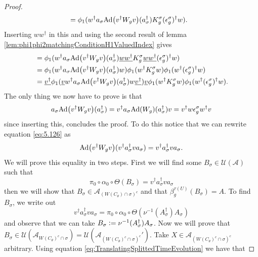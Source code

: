 \documentclass[12pt,a4paper,twoside]{article}
\newcommand{\defeq}{\vcentcolon=}
\let\originalleft\left
\let\originalright\right
\renewcommand{\left}{\mathopen{}\mathclose\bgroup\originalleft}
\renewcommand{\right}{\aftergroup\egroup\originalright}
\newcommand{\UU}{\mathcal U}
\renewcommand{\AA}{\mathcal A}
\newcommand{\Ad}[1]{\textrm{Ad}\left(#1\right)}
\theoremstyle{definition}
\numberwithin{equation}{section}
\begin{document}
\begin{proof}
\begin{align}
		&=\phi_1(w^\dagger a_\sigma \Ad{v^\dagger W_g v}(a_\sigma^\dagger)K_g^\sigma  (\epsilon_g^\sigma)^\dagger w).
	\end{align}
	Inserting $w w^\dagger$ in this and using the second result of lemma \ref{lem:phi1phi2matchingConditionH1ValuedIndex} gives
	\begin{align}
		&=\phi_1(w^\dagger a_\sigma \Ad{v^\dagger W_g v}(a_\sigma^\dagger)\underline{w w^\dagger}K_g^\sigma \underline{w w^\dagger}  (\epsilon_g^\sigma)^\dagger w)\\
		&=\phi_1(w^\dagger a_\sigma \Ad{v^\dagger W_g v}(a_\sigma^\dagger)w)\phi_1( w^\dagger K_g^\sigma w ) \phi_1( w^\dagger  (\epsilon_g^\sigma)^\dagger w)\\
		&=\underline{v^\dagger}\phi_1(\underline{v} w^\dagger a_\sigma \Ad{v^\dagger W_g v}(a_\sigma^\dagger)w \underline{v^\dagger})\underline{v}\phi_1( w^\dagger K_g^\sigma w ) \phi_1( w^\dagger  (\epsilon_g^\sigma)^\dagger w).
	\end{align}
	The only thing we now have to prove is that
	\begin{equation}\label{eq:5.126}
		a_\sigma \Ad{v^\dagger W_g v}(a_\sigma^\dagger)=v^\dagger a_\sigma \Ad{W_g}(a_\sigma^\dagger)v=v^\dagger w \epsilon_g^\sigma w^\dagger v
	\end{equation}
	since inserting this, concludes the proof. To do this notice that we can rewrite equation \eqref{eq:5.126} as
	\begin{equation}
		\Ad{v^\dagger W_g v}(v^\dagger a_\sigma^\dagger v a_\sigma)=v^\dagger a_\sigma^\dagger v a_\sigma.
	\end{equation}
	We will prove this equality in two steps. First we will find some $B_\sigma\in\UU(\AA)$ such that
	\begin{equation}
		\pi_0\circ\alpha_0\circ\Theta(B_\sigma)=v^\dagger a_\sigma^\dagger v a_\sigma
	\end{equation}
	then we will show that $B_\sigma\in\AA_{(W(C_\theta)\cap\sigma)^c}$ and that $\beta_g^{\tau(U)}(B_\sigma)=A$. To find $B_\sigma$, we write out
	\begin{equation}
		v^\dagger a_\sigma^\dagger v a_\sigma=\pi_0\circ\alpha_0\circ\Theta(\nu^{-1}(A_\sigma^\dagger)A_\sigma)
	\end{equation}
	and observe that we can take $B_\sigma \defeq \nu^{-1}(A_\sigma^\dagger)A_\sigma$. Now we will prove that $B_\sigma\in\UU(\AA_{W(C_\theta)^c\cap\sigma})=\UU(\AA_{(W(C_\theta)^c\cap\sigma)^c}')$. Take $X\in\AA_{(W(C_\theta)^c\cap\sigma)^c}$ arbitrary. Using equation \eqref{eq:TranslatingSplittedTimeEvolution} we have that

\end{proof}
\end{document}
